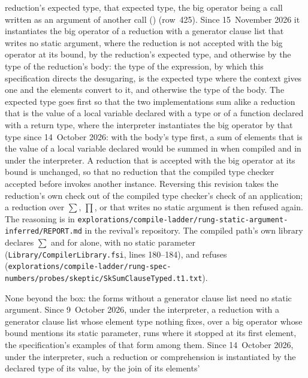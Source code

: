 \begin{description}
reduction's expected type, that expected type, the big operator being a call
written as an argument of another call ()
(row~425).
Since 15~November 2026 it instantiates the big operator of a reduction with a
generator clause list that writes no static argument, where the reduction is
not accepted with the big operator at its bound, by the reduction's expected
type, and otherwise by the type of the reduction's body: the type  of
the expression, by which this specification directs the desugaring, is the
expected type where the context gives one and the elements convert to it, and
otherwise the type of the body.
The expected type goes first so that the two implementations sum alike a
reduction that is the value of a local variable declared with a type or of a
function declared with a return type, where the interpreter instantiates the
big operator by that type since 14~October 2026: with the body's type first, a
sum of  elements that is the value of a local variable
declared  would be summed in  when compiled
and in  under the interpreter.
A reduction that is accepted with the big operator at its bound is unchanged,
so that no reduction that the compiled type checker accepted before invokes
another instance.
Reversing this revision takes the reduction's own check out of the compiled
type checker's check of an application; a reduction over $\sum$, $\prod$,
 or  that writes no
static argument is then refused again.
The reasoning is in
\nolinkurl{explorations/compile-ladder/rung-static-argument-inferred/REPORT.md}
in the revival's repository.
The compiled path's own library declares $\sum$ and
 for  alone, with no static
parameter (\nolinkurl{Library/CompilerLibrary.fsi}, lines 180--184), and
refuses 
(\nolinkurl{explorations/compile-ladder/rung-spec-numbers/probes/skeptic/SkSumClauseTyped.t1.txt}).
\item[Effect] None beyond the box: the forms without a generator clause list need
no static argument.
Since 9~October 2026, under the interpreter, a reduction with a generator clause
list whose element type nothing fixes, over a big operator whose bound mentions
its static parameter, runs where it stopped at its first element, the
specification's examples of that form among them.
Since 14~October 2026, under the interpreter, such a reduction or comprehension
is instantiated by the declared type of its value, by the join of its elements'

\end{description}
